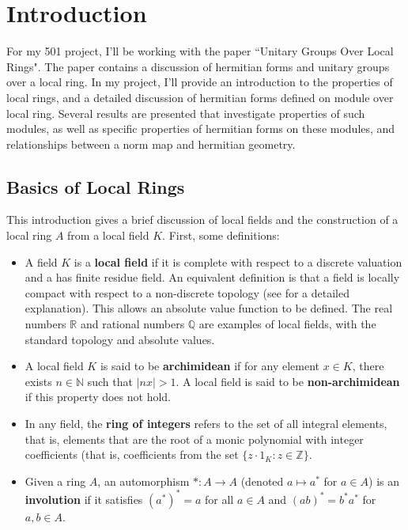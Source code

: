 \section{Introduction}

For my 501 project, I'll be working with the paper ``Unitary Groups Over Local Rings"\cite{cruickshank}.
The paper contains a discussion of hermitian forms and unitary groups over a local ring.
In my project, I'll provide an introduction to the properties of local rings, and a detailed discussion of hermitian forms
defined on module over local ring.
Several results are presented that investigate properties of such modules, as well as specific properties of hermitian forms on these modules,
and relationships between a norm map and hermitian geometry.

\subsection{Basics of Local Rings}

This introduction gives a brief discussion of local fields and the construction of a local ring $A$ from a local field $K$.
First, some definitions:

\begin{itemize}
\item A field $K$ is a \textbf{local field} if it is complete with respect to a discrete valuation and a has finite residue field.
An equivalent definition is that a field is locally compact with respect to a non-discrete topology (see \cite{serre} for a detailed explanation).
This allows an absolute value function to be defined.
The real numbers $\mathbb{R}$ and rational numbers $\mathbb{Q}$ are examples of local fields, with the standard topology and absolute values.
\item A local field $K$ is said to be \textbf{archimidean} if for any element $x \in K$, there exists $n \in \mathbb{N}$ such that $|nx| > 1$.
A local field is said to be \textbf{non-archimidean} if this property does not hold.
\item In any field, the \textbf{ring of integers} refers to the set of all integral elements, that is, 
elements that are the root of a monic polynomial with integer coefficients 
(that is, coefficients from the set $\{z \cdot 1_K : z \in \mathbb{Z} \}$.
\item Given a ring $A$, an automorphism $*: A \to A$ (denoted $a \mapsto a^*$ for $a \in A$) is an \textbf{involution} 
if it satisfies $(a^*)^* = a$ for all $a \in A$ and $(ab)^* = b^* a^*$ for $a, b \in A$.
\end{itemize}

